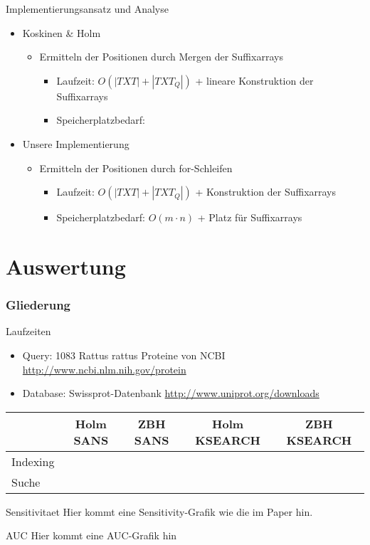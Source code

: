 \documentclass[aspectratio=1610]{beamer}
\begin{document}
\begin{frame}{Implementierungsansatz und Analyse}
  \begin{itemize}
    \item Koskinen \& Holm
      \begin{itemize}
        \item Ermitteln der Positionen durch Mergen der Suffixarrays
          \begin{itemize}
            \item Laufzeit: $O(|TXT|+|TXT_Q|)$ + lineare Konstruktion der Suffixarrays
            \item Speicherplatzbedarf:
          \end{itemize}
      \end{itemize}
    \item Unsere Implementierung
      \begin{itemize}
        \item Ermitteln der Positionen durch for-Schleifen
          \begin{itemize}
            \item Laufzeit: $O(|TXT|+|TXT_Q|)$ + Konstruktion der Suffixarrays
            \item Speicherplatzbedarf: $O(m \cdot n)$ + Platz für Suffixarrays
          \end{itemize}
      \end{itemize}
  \end{itemize}
\end{frame}

\section{Auswertung}
  \begin{frame} 
    \frametitle{Gliederung}
    \tableofcontents[currentsection]
  \end{frame}

\begin{frame}{Laufzeiten}
  \begin{itemize}
    \item Query: 1083 Rattus rattus Proteine von NCBI \tiny{\url{http://www.ncbi.nlm.nih.gov/protein}}
    \item \normalsize{Database: Swissprot-Datenbank} \tiny{\url{http://www.uniprot.org/downloads}}
  \end{itemize}
  \begin{tabular}{l|cccc}
    & Holm SANS & ZBH SANS & Holm KSEARCH & ZBH KSEARCH \\
    \hline
    Indexing & & & & \\
       Suche & & & & \\
  \end{tabular}
\end{frame}

\begin{frame}{Sensitivitaet}
  Hier kommt eine Sensitivity-Grafik wie die im Paper hin.
\end{frame}

\begin{frame}{AUC}
  Hier kommt eine AUC-Grafik hin
\end{frame}
\end{document}
